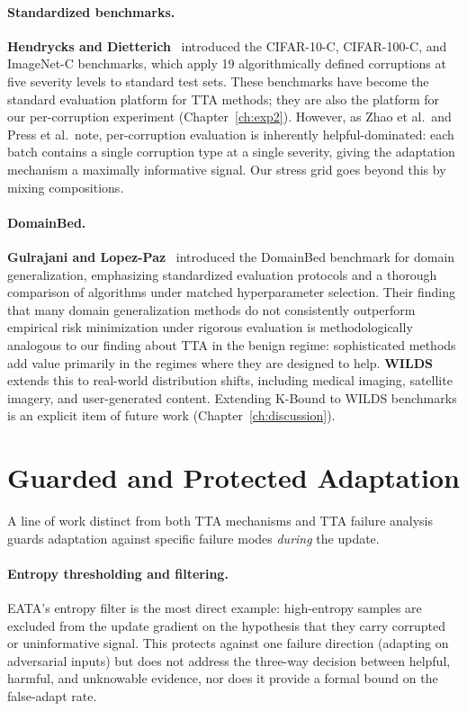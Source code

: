 \paragraph{Standardized benchmarks.}
\textbf{Hendrycks and Dietterich}~\cite{hendrycks2019benchmarking} introduced
the CIFAR-10-C, CIFAR-100-C, and ImageNet-C benchmarks, which apply 19
algorithmically defined corruptions at five severity levels to standard test
sets.
These benchmarks have become the standard evaluation platform for TTA methods;
they are also the platform for our per-corruption experiment
(Chapter~\ref{ch:exp2}).
However, as Zhao et al.\ and Press et al.\ note, per-corruption evaluation
is inherently helpful-dominated: each batch contains a single corruption type
at a single severity, giving the adaptation mechanism a maximally informative
signal.
Our stress grid goes beyond this by mixing compositions.

\paragraph{DomainBed.}
\textbf{Gulrajani and Lopez-Paz}~\cite{gulrajani2021domainbed} introduced the
DomainBed benchmark for domain generalization, emphasizing standardized
evaluation protocols and a thorough comparison of algorithms under matched
hyperparameter selection.
Their finding that many domain generalization methods do not consistently
outperform empirical risk minimization under rigorous evaluation is
methodologically analogous to our finding about TTA in the benign regime:
sophisticated methods add value primarily in the regimes where they are
designed to help.
\textbf{WILDS}~\cite{koh2021wilds} extends this to real-world distribution
shifts, including medical imaging, satellite imagery, and user-generated
content.
Extending K-Bound to WILDS benchmarks is an explicit item of future work
(Chapter~\ref{ch:discussion}).

\section{Guarded and Protected Adaptation}\label{sec:rel-guarded}

A line of work distinct from both TTA mechanisms and TTA failure analysis
guards adaptation against specific failure modes \emph{during} the update.

\paragraph{Entropy thresholding and filtering.}
EATA's entropy filter is the most direct example: high-entropy samples are
excluded from the update gradient on the hypothesis that they carry
corrupted or uninformative signal.
This protects against one failure direction (adapting on adversarial inputs)
but does not address the three-way decision between helpful, harmful, and
unknowable evidence, nor does it provide a formal bound on the false-adapt
rate.

